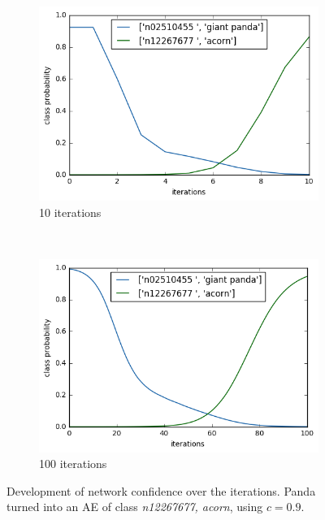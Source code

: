 \documentclass[11pt, a4paper]{article}
\begin{document}
\begin{figure}[h!tb]
    \centering
    \begin{subfigure}[t]{0.45\textwidth}
        \includegraphics[width=\textwidth]{confidence-evolution-10.png}
        \caption{10 iterations}
        \label{fig:confidence-evolution-10}
    \end{subfigure}
    ~ %
    \begin{subfigure}[t]{0.45\textwidth}
        \includegraphics[width=\textwidth]{confidence-evolution-100.png}
        \caption{100 iterations}
        \label{fig:confidence-evolution-100}
    \end{subfigure}
    \caption[Development of network confidence w.r.t iterations]{Development of network confidence over the iterations. Panda turned into an AE of class \emph{n12267677, acorn}, using $c = 0.9$.}
    \label{fig:confidence-evolution}
\end{figure}
\end{document}
